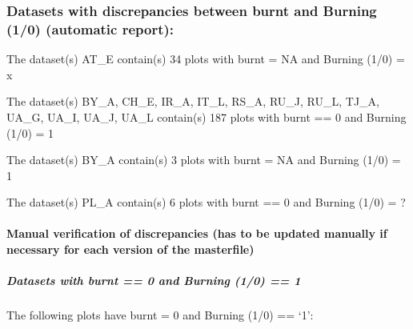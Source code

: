 \documentclass[table]{article}
\let\oldparagraph\paragraph
\renewcommand{\paragraph}[1]{\oldparagraph{#1}\mbox{}}
\let\oldsubparagraph\subparagraph
\renewcommand{\subparagraph}[1]{\oldsubparagraph{#1}\mbox{}}
\begin{document}
\subsubsection{Datasets with discrepancies between burnt and Burning
(1/0) (automatic
report):}\label{datasets-with-discrepancies-between-burnt-and-burning-10-automatic-report}

The dataset(s) AT\_E contain(s) 34 plots with burnt = NA and Burning
(1/0) = x

The dataset(s) BY\_A, CH\_E, IR\_A, IT\_L, RS\_A, RU\_J, RU\_L, TJ\_A,
UA\_G, UA\_I, UA\_J, UA\_L contain(s) 187 plots with burnt == 0 and
Burning (1/0) = 1

The dataset(s) BY\_A contain(s) 3 plots with burnt = NA and Burning
(1/0) = 1

The dataset(s) PL\_A contain(s) 6 plots with burnt == 0 and Burning
(1/0) = ?

\paragraph{Manual verification of discrepancies (has to be updated
manually if necessary for each version of the
masterfile)}\label{manual-verification-of-discrepancies-has-to-be-updated-manually-if-necessary-for-each-version-of-the-masterfile-2}

\subparagraph{\texorpdfstring{\emph{Datasets with burnt == 0 and Burning
(1/0) ==
1}}{Datasets with burnt == 0 and Burning (1/0) == 1}}\label{datasets-with-burnt-0-and-burning-10-1}

The following plots have burnt = 0 and Burning (1/0) == `1':
\end{document}
